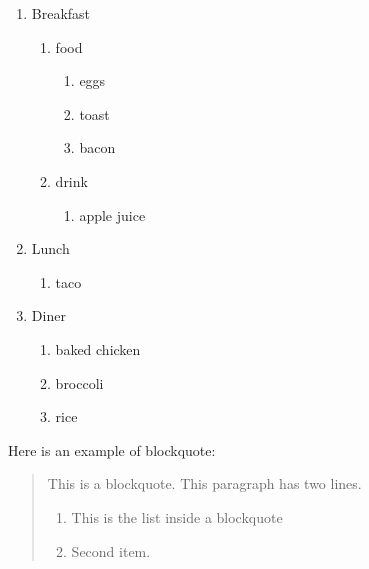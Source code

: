 \documentclass[]{article}
\providecommand{\tightlist}{%
  \setlength{\itemsep}{0pt}\setlength{\parskip}{0pt}}
\begin{document}
\begin{enumerate}
\def\labelenumi{\arabic{enumi}.}
\tightlist
\item
  Breakfast

  \begin{enumerate}
  \def\labelenumii{\alph{enumii}.}
  \tightlist
  \item
    food

    \begin{enumerate}
    \def\labelenumiii{\roman{enumiii}.}
    \tightlist
    \item
      eggs
    \item
      toast
    \item
      bacon
    \end{enumerate}
  \item
    drink

    \begin{enumerate}
    \def\labelenumiii{\roman{enumiii}.}
    \tightlist
    \item
      apple juice
    \end{enumerate}
  \end{enumerate}
\item
  Lunch

  \begin{enumerate}
  \def\labelenumii{\alph{enumii}.}
  \tightlist
  \item
    taco
  \end{enumerate}
\item
  Diner

  \begin{enumerate}
  \def\labelenumii{\alph{enumii}.}
  \tightlist
  \item
    baked chicken
  \item
    broccoli
  \item
    rice
  \end{enumerate}
\end{enumerate}

Here is an example of blockquote:

\begin{quote}
This is a blockquote. This paragraph has two lines.

\begin{enumerate}
\def\labelenumi{\arabic{enumi}.}
\tightlist
\item
  This is the list inside a blockquote
\item
  Second item.
\end{enumerate}
\end{quote}
\end{document}
